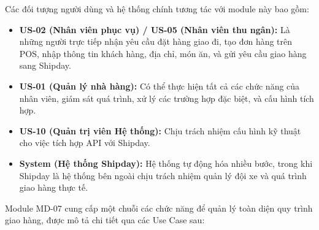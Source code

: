 \label{sssec:md07_primary_users}
Các đối tượng người dùng và hệ thống chính tương tác với module này bao gồm:
\begin{itemize}
    \item \textbf{US-02 (Nhân viên phục vụ) / US-05 (Nhân viên thu ngân):} Là những người trực tiếp nhận yêu cầu đặt hàng giao đi, tạo đơn hàng trên POS, nhập thông tin khách hàng, địa chỉ, món ăn, và gửi yêu cầu giao hàng sang Shipday.
    \item \textbf{US-01 (Quản lý nhà hàng):} Có thể thực hiện tất cả các chức năng của nhân viên, giám sát quá trình, xử lý các trường hợp đặc biệt, và cấu hình tích hợp.
    \item \textbf{US-10 (Quản trị viên Hệ thống):} Chịu trách nhiệm cấu hình kỹ thuật cho việc tích hợp API với Shipday.
    \item \textbf{System (Hệ thống Shipday):} Hệ thống tự động hóa nhiều bước, trong khi Shipday là hệ thống bên ngoài chịu trách nhiệm quản lý đội xe và quá trình giao hàng thực tế.
\end{itemize}

\label{sssec:md07_key_functionalities}
Module MD-07 cung cấp một chuỗi các chức năng để quản lý toàn diện quy trình giao hàng, được mô tả chi tiết qua các Use Case sau:


